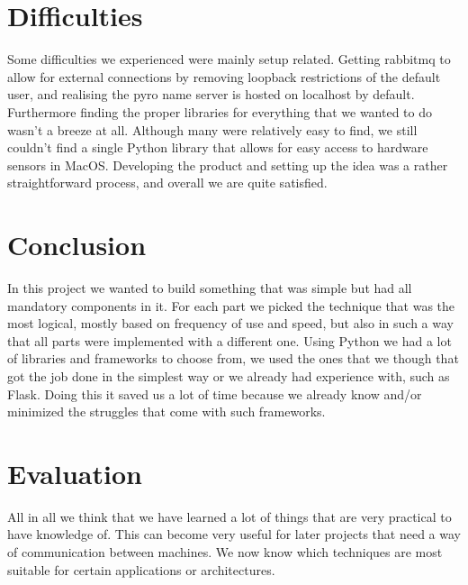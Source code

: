 \documentclass{article}
\begin{document}
\section{Difficulties}
	Some difficulties we experienced were mainly setup related. Getting rabbitmq
	to allow for external connections by removing loopback restrictions of the 
	default user, and realising the pyro name server is hosted on localhost by 
	default. Furthermore finding the proper libraries for everything that we 
	wanted to do wasn't a breeze at all. Although many were relatively easy to 
	find, we still couldn't find a single Python library that allows for easy 
	access to hardware sensors in MacOS. Developing the product and setting up 
	the idea was a rather straightforward process, and overall we are quite 
	satisfied.

\section{Conclusion}
	In this project we wanted to build something that was simple but had all
	mandatory components in it. For each part we picked the technique that 
	was the most logical, mostly based on frequency of use and speed, but also in
	such a way that all parts were implemented with a different one. Using 
	Python we had a lot of libraries and frameworks to choose from, we used 
	the ones that we though that got the job done in the simplest way or we 
	already had experience with, such as Flask. Doing this it saved us a lot of 
	time because we already know and/or minimized the struggles that come with 
	such frameworks. 

\section{Evaluation}
	All in all we think that we have learned a lot of things that are very 
	practical to have knowledge of. This can become very useful for later 
	projects that need a way of communication between machines. We now know 
	which techniques are most suitable for certain applications or architectures.
\end{document}
